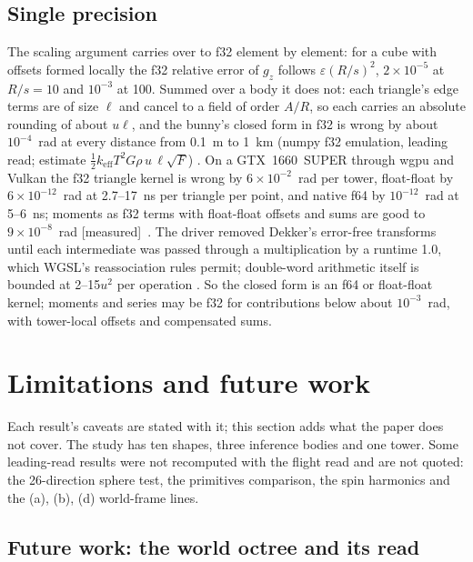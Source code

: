 \documentclass[10pt,a4paper]{article}
\newcommand{\tagM}{\textsf{\small[measured]}}
\begin{document}
\subsection{Single precision}\label{sec:f32}

The scaling argument carries over to f32 element by element: for a cube
with offsets formed locally the f32 relative error of $g_z$ follows $\varepsilon(R/s)^2$,
$2\times10^{-5}$ at $R/s=10$ and $10^{-3}$ at 100. Summed over a body it does not: each triangle's
edge terms are of size $\ell$ and cancel to a field of order $A/R$, so each carries an absolute
rounding of about $u\ell$, and the bunny's closed form in f32 is wrong by about $10^{-4}$~rad at every
distance from 0.1~m to 1~km (numpy f32 emulation, leading read; estimate $\frac12k_\mathrm{eff}T^2
G\rho\,u\,\ell\sqrt F$) \citep[\S B]{paperboxes}. On a GTX~1660~SUPER through wgpu and Vulkan the f32
triangle kernel is wrong by $6\times10^{-2}$~rad per tower, float-float by $6\times10^{-12}$~rad at
2.7--17~ns per triangle per point, and native f64 by $10^{-12}$~rad at 5--6~ns; moments as f32 terms
with float-float offsets and sums are good to $9\times10^{-8}$~rad \tagM\
\citep[\S6]{papersurface}. The driver removed Dekker's error-free transforms until each intermediate
was passed through a multiplication by a runtime 1.0, which WGSL's reassociation rules permit; double-word
arithmetic itself is bounded at 2--15$u^2$ per operation \citep{joldes2017}. So the closed form is an
f64 or float-float kernel; moments and series may be f32 for contributions below about
$10^{-3}$~rad, with tower-local offsets and compensated sums.

\section{Limitations and future work}\label{sec:limits}

Each result's caveats are stated with it; this section adds what the paper does not cover. The study
has ten shapes, three inference bodies and one tower. Some leading-read results
were not recomputed with the flight read and are not quoted: the 26-direction sphere test, the
primitives comparison, the spin harmonics and the (a), (b), (d) world-frame lines.

\subsection{Future work: the world octree and its read}\label{sec:future}
\end{document}
